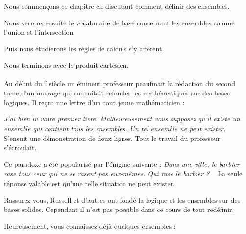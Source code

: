 





\debuttexte

\diapo

\change

\change

Nous commençons ce chapitre  
en discutant comment définir des ensembles.

\change

Nous verrons ensuite le vocabulaire de base concernant 
les ensembles comme l'union et l'intersection.

\change

Puis nous étudierons les règles de calculs s'y afférent.

\change

Nous terminons avec le produit cartésien.


\diapo

Au début du \textsc{}\textsuperscript{e} siècle un éminent professeur
peaufinait la rédaction du second tome d'un ouvrage qui souhaitait refonder les mathématiques sur des bases logiques.
Il reçut une lettre d'un tout jeune mathématicien :

\change

\emph{\og J'ai bien lu votre premier livre. Malheureusement vous supposez qu'il existe un ensemble
qui contient tous les ensembles. Un tel ensemble ne peut exister. \fg\ }
S'ensuit une démonstration de deux lignes. Tout le travail du professeur s'écroulait.

\change

Ce paradoxe a été popularisé par l’énigme suivante :
\emph{\og Dans une ville, le barbier rase tous ceux qui ne se rasent pas eux-mêmes.
Qui rase le barbier ? \fg\ }
La seule réponse valable est qu'une telle situation ne peut exister.



Rassurez-vous, Russell et d'autres ont fondé la logique et les ensembles sur des bases
solides. Cependant il n'est pas possible dans ce cours de tout redéfinir.



Heureusement, vous connaissez déjà quelques ensembles :


\change


